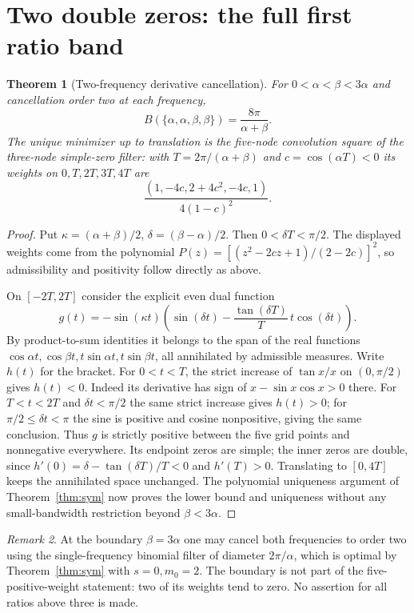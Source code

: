 \documentclass[11pt]{article}
\newtheorem{theorem}{Theorem}[section]
\theoremstyle{remark}\newtheorem{remark}[theorem]{Remark}
\begin{document}
\section{Two double zeros: the full first ratio band}
\begin{theorem}[Two-frequency derivative cancellation]\label{thm:double}
For $0<\alpha<\beta<3\alpha$ and cancellation order two at each frequency,
\[
 B(\{\alpha,\alpha,\beta,\beta\})=\frac{8\pi}{\alpha+\beta}.
\]
The unique minimizer up to translation is the five-node convolution square of the three-node simple-zero filter: with $T=2\pi/(\alpha+\beta)$ and $c=\cos(\alpha T)<0$ its weights on $0,T,2T,3T,4T$ are
\[
 \frac{(1,-4c,2+4c^2,-4c,1)}{4(1-c)^2}.
\]
\end{theorem}
\begin{proof}
Put $\kappa=(\alpha+\beta)/2$, $\delta=(\beta-\alpha)/2$. Then $0<\delta T<\pi/2$. The displayed weights come from the polynomial $P(z)=[(z^2-2cz+1)/(2-2c)]^2$, so admissibility and positivity follow directly as above.

On $[-2T,2T]$ consider the explicit even dual function
\[
 g(t)=-\sin(\kappa t)\left(\sin(\delta t)-\frac{\tan(\delta T)}T\,t\cos(\delta t)\right).
\]
By product-to-sum identities it belongs to the span of the real functions $\cos\alpha t,\cos\beta t,t\sin\alpha t,t\sin\beta t$, all annihilated by admissible measures. Write $h(t)$ for the bracket. For $0<t<T$, the strict increase of $\tan x/x$ on $(0,\pi/2)$ gives $h(t)<0$. Indeed its derivative has sign of $x-\sin x\cos x>0$ there. For $T<t<2T$ and $\delta t<\pi/2$ the same strict increase gives $h(t)>0$; for $\pi/2\le\delta t<\pi$ the sine is positive and cosine nonpositive, giving the same conclusion. Thus $g$ is strictly positive between the five grid points and nonnegative everywhere. Its endpoint zeros are simple; the inner zeros are double, since $h'(0)=\delta-\tan(\delta T)/T<0$ and $h'(T)>0$. Translating to $[0,4T]$ keeps the annihilated space unchanged. The polynomial uniqueness argument of Theorem~\ref{thm:sym} now proves the lower bound and uniqueness without any small-bandwidth restriction beyond $\beta<3\alpha$.
\end{proof}
\begin{remark}
At the boundary $\beta=3\alpha$ one may cancel both frequencies to order two using the single-frequency binomial filter of diameter $2\pi/\alpha$, which is optimal by Theorem~\ref{thm:sym} with $s=0,m_0=2$. The boundary is not part of the five-positive-weight statement: two of its weights tend to zero. No assertion for all ratios above three is made.
\end{remark}
\end{document}
